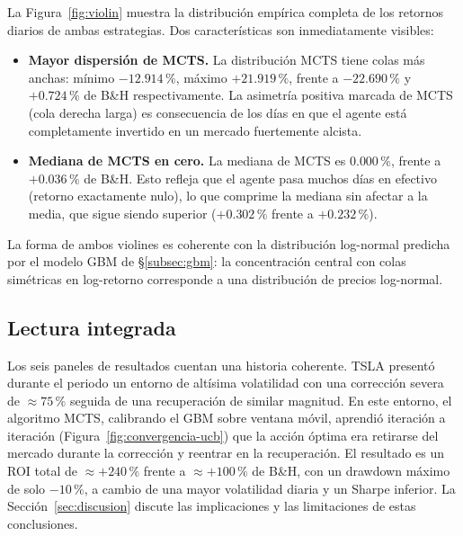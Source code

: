La Figura~\ref{fig:violin} muestra la distribución empírica completa de los retornos diarios de ambas estrategias. Dos características son inmediatamente visibles:

\begin{itemize}
    \item \textbf{Mayor dispersión de MCTS.} La distribución MCTS tiene colas más anchas: mínimo $-12{.}914\,\%$, máximo $+21{.}919\,\%$, frente a $-22{.}690\,\%$ y $+0{.}724\,\%$ de B\&H respectivamente. La asimetría positiva marcada de MCTS (cola derecha larga) es consecuencia de los días en que el agente está completamente invertido en un mercado fuertemente alcista.
    \item \textbf{Mediana de MCTS en cero.} La mediana de MCTS es $0{.}000\,\%$, frente a $+0{.}036\,\%$ de B\&H. Esto refleja que el agente pasa muchos días en efectivo (retorno exactamente nulo), lo que comprime la mediana sin afectar a la media, que sigue siendo superior ($+0{.}302\,\%$ frente a $+0{.}232\,\%$).
\end{itemize}

La forma de ambos violines es coherente con la distribución log-normal predicha por el modelo GBM de §\ref{subsec:gbm}: la concentración central con colas simétricas en log-retorno corresponde a una distribución de precios log-normal.

\subsection{Lectura integrada}
\label{subsec:lectura-integrada}

Los seis paneles de resultados cuentan una historia coherente. TSLA presentó durante el periodo un entorno de altísima volatilidad con una corrección severa de $\approx 75\,\%$ seguida de una recuperación de similar magnitud. En este entorno, el algoritmo MCTS, calibrando el GBM sobre ventana móvil, aprendió iteración a iteración (Figura~\ref{fig:convergencia-ucb}) que la acción óptima era retirarse del mercado durante la corrección y reentrar en la recuperación. El resultado es un ROI total de $\approx +240\,\%$ frente a $\approx +100\,\%$ de B\&H, con un drawdown máximo de solo $-10\,\%$, a cambio de una mayor volatilidad diaria y un Sharpe inferior. La Sección~\ref{sec:discusion} discute las implicaciones y las limitaciones de estas conclusiones.
